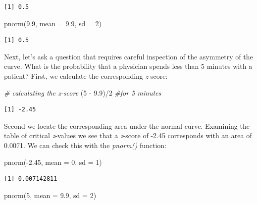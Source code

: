 \documentclass[
  11pt,
]{book}
\newenvironment{Shaded}{\begin{snugshade}}{\end{snugshade}}
\newcommand{\AttributeTok}[1]{\textcolor[rgb]{0.77,0.63,0.00}{#1}}
\newcommand{\CommentTok}[1]{\textcolor[rgb]{0.56,0.35,0.01}{\textit{#1}}}
\newcommand{\DecValTok}[1]{\textcolor[rgb]{0.00,0.00,0.81}{#1}}
\newcommand{\FloatTok}[1]{\textcolor[rgb]{0.00,0.00,0.81}{#1}}
\newcommand{\FunctionTok}[1]{\textcolor[rgb]{0.00,0.00,0.00}{#1}}
\newcommand{\NormalTok}[1]{#1}
\newcommand{\SpecialCharTok}[1]{\textcolor[rgb]{0.00,0.00,0.00}{#1}}
\begin{document}
\begin{verbatim}
[1] 0.5
\end{verbatim}

\begin{Shaded}
\begin{Highlighting}[]
\FunctionTok{pnorm}\NormalTok{(}\FloatTok{9.9}\NormalTok{, }\AttributeTok{mean =} \FloatTok{9.9}\NormalTok{, }\AttributeTok{sd =} \DecValTok{2}\NormalTok{)}
\end{Highlighting}
\end{Shaded}

\begin{verbatim}
[1] 0.5
\end{verbatim}

Next, let's ask a question that requires careful inspection of the asymmetry of the curve. What is the probability that a physician spends less than 5 minutes with a patient? First, we calculate the corresponding \emph{z}-score:

\begin{Shaded}
\begin{Highlighting}[]
\CommentTok{\# calculating the z{-}score}
\NormalTok{(}\DecValTok{5} \SpecialCharTok{{-}} \FloatTok{9.9}\NormalTok{)}\SpecialCharTok{/}\DecValTok{2}  \CommentTok{\#for 5 minutes}
\end{Highlighting}
\end{Shaded}

\begin{verbatim}
[1] -2.45
\end{verbatim}

Second we locate the corresponding area under the normal curve. Examining the table of critical \emph{z}-values we see that a \emph{z}-score of -2.45 corresponds with an area of 0.0071. We can check this with the \emph{pnorm()} function:

\begin{Shaded}
\begin{Highlighting}[]
\FunctionTok{pnorm}\NormalTok{(}\SpecialCharTok{{-}}\FloatTok{2.45}\NormalTok{, }\AttributeTok{mean =} \DecValTok{0}\NormalTok{, }\AttributeTok{sd =} \DecValTok{1}\NormalTok{)}
\end{Highlighting}
\end{Shaded}

\begin{verbatim}
[1] 0.007142811
\end{verbatim}

\begin{Shaded}
\begin{Highlighting}[]
\FunctionTok{pnorm}\NormalTok{(}\DecValTok{5}\NormalTok{, }\AttributeTok{mean =} \FloatTok{9.9}\NormalTok{, }\AttributeTok{sd =} \DecValTok{2}\NormalTok{)}
\end{Highlighting}
\end{Shaded}
\end{document}
